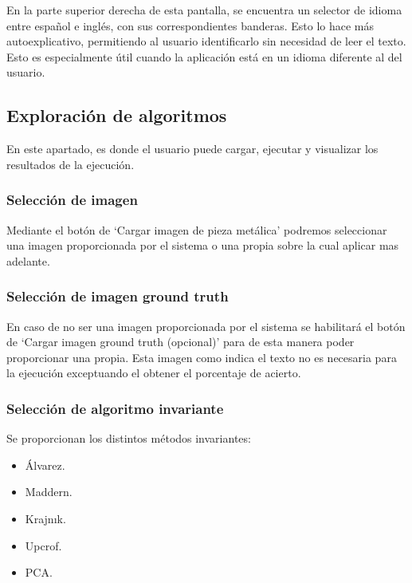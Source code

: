 En la parte superior derecha de esta pantalla, se encuentra un selector de idioma entre español e inglés, con sus correspondientes banderas. Esto lo hace más autoexplicativo, permitiendo al usuario identificarlo sin necesidad de leer el texto. Esto es especialmente útil cuando la aplicación está en un idioma diferente al del usuario.

\subsection{Exploración de algoritmos}\label{exploración-de-algoritmos}

En este apartado, es donde el usuario puede cargar, ejecutar y visualizar los resultados de la ejecución.


\subsubsection{Selección de imagen}\label{selección-de-imagen}

Mediante el botón de `Cargar imagen de pieza metálica' podremos seleccionar una imagen proporcionada por el sistema o una propia sobre la cual aplicar mas adelante.

\subsubsection{Selección de imagen ground truth}\label{selección-de-imagen-ground-truth}

En caso de no ser una imagen proporcionada por el sistema se habilitará el botón de `Cargar imagen ground truth (opcional)' para de esta manera poder proporcionar una propia. Esta imagen como indica el texto no es necesaria para la ejecución exceptuando el obtener el porcentaje de acierto.

\subsubsection{Selección de algoritmo invariante}\label{selección-de-algoritmo-invariante}

Se proporcionan los distintos métodos invariantes:

\begin{itemize}
    \item Álvarez.
    \item Maddern.
    \item Krajnık.
    \item Upcrof.
    \item PCA.
\end{itemize}

